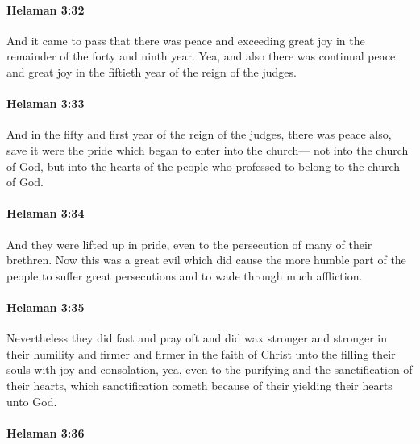 		\paragraph{Helaman 3:32} %
			\label{HELAMAN-3-32}

			And it came to pass that there was peace and exceeding great joy
			in the remainder of the forty and ninth year.
			Yea, and also there was continual peace and great joy
			in the fiftieth year of the reign of the judges.

		\paragraph{Helaman 3:33} %
			\label{HELAMAN-3-33}

			And in the fifty and first year of the reign of the judges,
			there was peace also,
			save it were the pride which began to enter into the church---
			not into the church of God,
			but into the hearts of the people
			who professed to belong to the church of God.

		\paragraph{Helaman 3:34} %
			\label{HELAMAN-3-34}

			And they were lifted up in pride,
			even to the persecution of many of their brethren.
			Now this was a great evil
			which did cause the more humble part of the people
			to suffer great persecutions and to wade through much affliction.

		\paragraph{Helaman 3:35} %
			\label{HELAMAN-3-35}

			Nevertheless they did fast and pray oft
			and did wax stronger and stronger in their humility
			and firmer and firmer in the faith of Christ
			unto the filling their souls with joy and consolation,
			yea, even to the purifying and the sanctification of their hearts,
			which sanctification cometh because of their yielding their hearts unto God.

		\paragraph{Helaman 3:36} %
			\label{HELAMAN-3-36}

